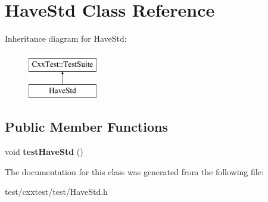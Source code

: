 \hypertarget{classHaveStd}{\section{Have\-Std Class Reference}
\label{classHaveStd}
}
Inheritance diagram for Have\-Std\-:\begin{figure}[H]
\begin{center}
\leavevmode
\includegraphics[height=2.000000cm]{classHaveStd}
\end{center}
\end{figure}
\subsection*{Public Member Functions}
\begin{DoxyCompactItemize}
\item 
\hypertarget{classHaveStd_ab3a53ab9c78ed8201b517cca28a197c6}{void {\bfseries test\-Have\-Std} ()}\label{classHaveStd_ab3a53ab9c78ed8201b517cca28a197c6}

\end{DoxyCompactItemize}


The documentation for this class was generated from the following file\-:\begin{DoxyCompactItemize}
\item 
test/cxxtest/test/Have\-Std.\-h\end{DoxyCompactItemize}
